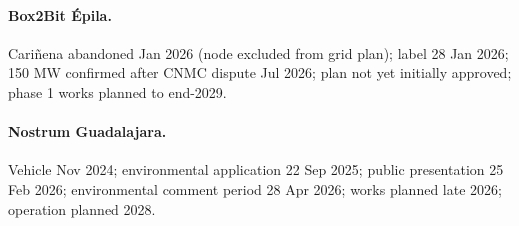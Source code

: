 \documentclass[11pt]{article}
\begin{document}
\paragraph{Box2Bit Épila.} Cariñena abandoned Jan 2026 (node excluded from grid plan); label 28 Jan 2026; 150 MW confirmed after CNMC dispute Jul 2026; plan not yet initially approved; phase 1 works planned to end-2029.

\paragraph{Nostrum Guadalajara.} Vehicle Nov 2024; environmental application 22 Sep 2025; public presentation 25 Feb 2026; environmental comment period 28 Apr 2026; works planned late 2026; operation planned 2028.
\end{document}
